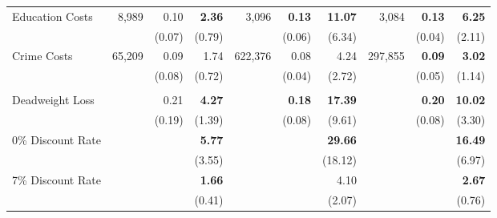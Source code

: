 \begin{tabular}{l r r r r r r r r r}
Education Costs	&	8,989	&	0.10	&	\textbf{2.36}	&	3,096	&	\textbf{0.13}	&	\textbf{11.07}	&	3,084	&	\textbf{0.13}	&	\textbf{6.25}	\\
	&		&	(0.07)	&	(0.79)	&		&	(0.06)	&	(6.34)	&		&	(0.04)	&	(2.11)	\\
Crime Costs	&	65,209	&	0.09	&	1.74	&	622,376	&	0.08	&	4.24	&	297,855	&	\textbf{0.09}	&	\textbf{3.02}	\\
	&		&	(0.08)	&	(0.72)	&		&	(0.04)	&	(2.72)	&		&	(0.05)	&	(1.14)	\\ \\
Deadweight Loss	&		&	0.21	&	\textbf{4.27}	&		&	\textbf{0.18}	&	\textbf{17.39}	&		&	\textbf{0.20}	&	\textbf{10.02}	\\
	&		&	(0.19)	&	(1.39)	&		&	(0.08)	&	(9.61)	&		&	(0.08)	&	(3.30)	\\
0\% Discount Rate	&		&		&	\textbf{5.77}	&		&		&	\textbf{29.66}	&		&		&	\textbf{16.49}	\\
	&		&		&	(3.55)	&		&		&	(18.12)	&		&		&	(6.97)	\\
7\% Discount Rate	&		&		&	\textbf{1.66}	&		&		&	4.10	&		&		&	\textbf{2.67}	\\
	&		&		&	(0.41)	&		&		&	(2.07)	&		&		&	(0.76)	\\
\bottomrule																			
\end{tabular}																			
